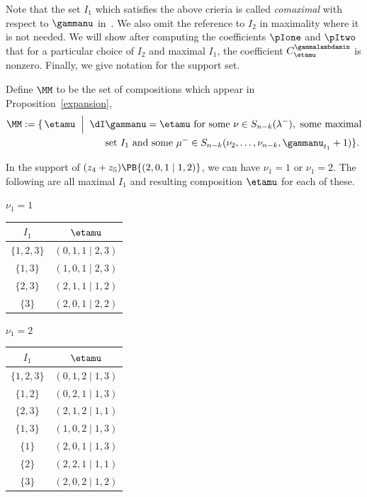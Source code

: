 Note that the set $I_1$ which satisfies the above crieria is called \textit{comaximal} with respect to $\gammanu$ in~\cite{MR2525842}. We also omit the reference to $I_2$ in maximality where it is not needed. We will show after computing the coefficients $\pIone$ and $\pItwo$ that for a particular choice of $I_2$ and maximal $I_1$, the coefficient $C^{\gammalambdamin}_{\etamu}$ is nonzero. Finally, we give notation for the support set.

\begin{defi}
Define $\MM$ to be the set of compositions which appear in Proposition~\ref{expansion},
\begin{align*} \MM := \{\, \etamu \hspace*{.2cm} \Big| \hspace*{.2cm} \dI &\gammanu = \etamu \text{ for some } \nu \in S_{n-k}(\lambda^-), \text{ some maximal} \\ & \text{set } I_1 \text{ and some } \mu^- \in S_{n-k}(\nu_2, \dotsc, \nu_{n-k}, \gammanu_{t_1}+1)\} .\end{align*}
\end{defi}


\begin{exam}
    In the support of $(z_4+z_5)\PB{(2,0,1 \mid 1,2)}$, we can have $\nu_1=1$ or $\nu_1=2$. The following are all maximal $I_1$ and resulting composition $\etamu$ for each of these.

    \begin{center} 
        $\nu_1=1$ \quad\begin{tabular}{c|c} $I_1$ & $\etamu$ \\ \hline
        $\{1,2,3\}$ & $(0,1,1 \mid 2,3)$  \\
        $\{1,3\}$ & $(1,0,1 \mid 2,3)$ \\
        $\{2,3\}$ & $(2,1,1 \mid 1,2)$\\
        $\{3\}$ & $(2,0,1 \mid 2,2)$\end{tabular} \qquad $\nu_1=2$ \quad\begin{tabular}{c|c} $I_1$ & $\etamu$ \\ \hline
        $\{1,2,3\}$ & $(0,1,2 \mid 1,3)$  \\
        $\{1,2\}$ & $(0,2,1\mid 1,3)$ \\
        $\{2,3\}$ & $(2,1,2 \mid 1, 1)$\\
        $\{1,3\}$ & $(1,0,2\mid 1,3)$\\
        $\{1\}$ & $(2,0,1 \mid 1, 3)$\\
        $\{2\}$ & $(2,2,1 \mid 1,1)$\\
        $\{3\}$ & $(2,0,2 \mid 1,2)$\end{tabular}
    \end{center}
\end{exam}

